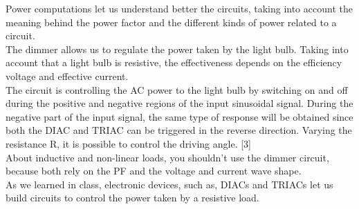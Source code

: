 \documentclass[journal]{IEEEtran}
\begin{document}
Power computations let us understand better the circuits, taking into 
account the meaning behind the power factor and the different kinds of 
power related to a circuit.\\

The dimmer allows us to regulate the power taken by the light bulb. 
Taking into account that a light bulb is resistive, the effectiveness 
depends on the efficiency voltage and effective current. \\

The circuit is controlling the AC power to the light bulb by switching 
on and off during the positive and negative regions of the input 
sinusoidal signal. During the negative part of the input signal, the 
same type of response will be obtained since both the DIAC and TRIAC 
can be triggered in the reverse direction. Varying the resistance R, 
it is possible to control the driving angle. [3]\\

About inductive and non-linear loads, you shouldn't use the dimmer 
circuit, because both rely on the PF and the voltage and current wave 
shape.\\

As we learned in class, electronic devices, such as, DIACs and TRIACs 
let us build circuits to control the power taken by a resistive 
load.\\

\end{document}

